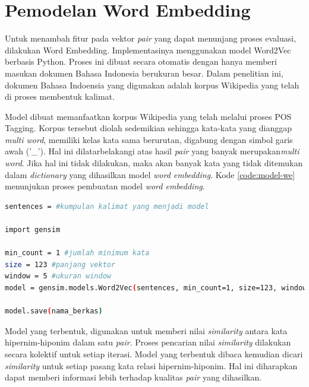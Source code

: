 \section{Pemodelan Word Embedding}
Untuk menambah fitur pada vektor \textit{pair} yang dapat menunjang proses evaluasi, dilakukan Word Embedding. Implementasinya menggunakan model Word2Vec berbasis Python. Proses ini dibuat secara otomatis dengan hanya memberi masukan dokumen Bahasa Indonesia berukuran besar. Dalam penelitian ini, dokumen Bahasa Indoensia yang digunakan adalah korpus Wikipedia yang telah di proses membentuk kalimat.

Model dibuat memanfaatkan korpus Wikipedia yang telah melalui proses POS Tagging. Korpus tersebut diolah sedemikian sehingga kata-kata yang dianggap \textit{multi word}, memiliki kelas kata sama berurutan, digabung dengan simbol garis  awah ('\_'). Hal ini dilatarbelakangi atas hasil \textit{pair} yang banyak merupakan\textit{multi word}. Jika hal ini tidak dilakukan, maka akan banyak kata yang tidak ditemukan dalam \textit{dictionary} yang dihasilkan model \textit{word embedding}. Kode \ref{code:model-we} menunjukan proses pembuatan model \textit{word embedding}.

\begin{lstlisting}[caption={Kode pembangunan model \textit{word embedding}}, language=bash, label={code:model-we}]
sentences = #kumpulan kalimat yang menjadi model

import gensim

min_count = 1 #jumlah minimum kata
size = 123 #panjang vektor
window = 5 #ukuran window
model = gensim.models.Word2Vec(sentences, min_count=1, size=123, window=5);

model.save(nama_berkas)
\end{lstlisting}

Model yang terbentuk, digunakan untuk memberi nilai \textit{similarity} antara kata hipernim-hiponim dalam satu \textit{pair}. Proses pencarian nilai \textit{similarity} dilakukan secara kolektif untuk setiap iterasi. Model yang terbentuk dibaca kemudian dicari \textit{similarity} untuk setiap pasang kata relasi hipernim-hiponim. Hal ini diharapkan dapat memberi informasi lebih terhadap kualitas \textit{pair} yang dihasilkan.
